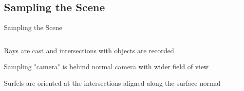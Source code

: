 \documentclass[10pt,handout,compress,professionalfont]{beamer}
\begin{document}
\subsection{Sampling the Scene}
\begin{frame}{Sampling the Scene}

    \begin{columns}
        \begin{column}{0.5\textwidth}

    \vspace{-5mm}
    Rays are cast and intersections with objects are recorded\\
    \vspace{8mm}

    Sampling "camera" is behind normal camera with wider field of view\\
    \vspace{8mm}

    Surfels are oriented at the intersections aligned along the surface normal

        \end{column}
        \begin{column}{0.5\textwidth}
            \vspace{-4mm}
            \includegraphics[width=\textwidth]{../img/diag/surfel_samp_mod.pdf}\\
        \end{column}
    \end{columns}

\end{frame}
\end{document}
